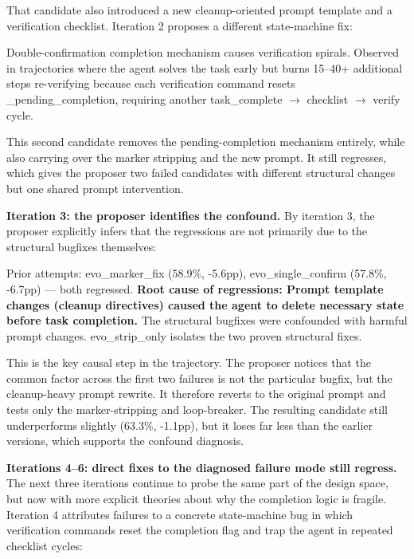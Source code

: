 That candidate also introduced a new cleanup-oriented prompt template and a verification checklist.
Iteration 2 proposes a different state-machine fix:

\begin{logbox}
Double-confirmation completion mechanism causes verification spirals. Observed in trajectories where the agent solves the task early but burns 15--40+ additional steps re-verifying because each verification command resets \_pending\_completion, requiring another task\_complete $\rightarrow$ checklist $\rightarrow$ verify cycle.
\end{logbox}

This second candidate removes the pending-completion mechanism entirely, while also carrying over the marker stripping and the new prompt.
It still regresses, which gives the proposer two failed candidates with different structural changes but one shared prompt intervention.

\textbf{Iteration 3: the proposer identifies the confound.}
By iteration 3, the proposer explicitly infers that the regressions are not primarily due to the structural bugfixes themselves:

\begin{logbox}
Prior attempts: evo\_marker\_fix (58.9\%, -5.6pp), evo\_single\_confirm (57.8\%, -6.7pp) --- both regressed. \textbf{Root cause of regressions: Prompt template changes (cleanup directives) caused the agent to delete necessary state before task completion.} The structural bugfixes were confounded with harmful prompt changes. evo\_strip\_only isolates the two proven structural fixes.
\end{logbox}

This is the key causal step in the trajectory.
The proposer notices that the common factor across the first two failures is not the particular bugfix, but the cleanup-heavy prompt rewrite.
It therefore reverts to the original prompt and tests only the marker-stripping and loop-breaker.
The resulting candidate still underperforms slightly (63.3\%, -1.1pp), but it loses far less than the earlier versions, which supports the confound diagnosis.

\textbf{Iterations 4--6: direct fixes to the diagnosed failure mode still regress.}
The next three iterations continue to probe the same part of the design space, but now with more explicit theories about why the completion logic is fragile.
Iteration 4 attributes failures to a concrete state-machine bug in which verification commands reset the completion flag and trap the agent in repeated checklist cycles:


